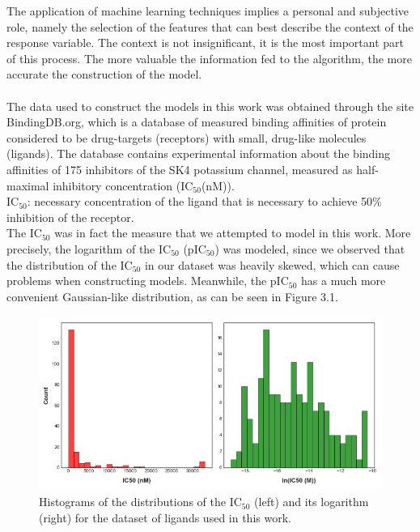 \hspace{1.5cm}The application of machine learning techniques implies a personal and subjective role, namely the selection of the features that can best describe the context of the response variable. The context is not insignificant, it is the most important part of this process. The more valuable the information fed to the algorithm, the more accurate the construction of the model.\\\\
The data used to construct the models in this work was obtained through the site BindingDB.org, which is a database of measured binding affinities of protein considered to be drug-targets (receptors) with small, drug-like molecules (ligands). The database contains experimental information about the binding affinities of 175 inhibitors of the SK4 potassium channel, measured as half-maximal inhibitory concentration ($\text{IC}_{50}$(nM)).\\

\textbullet\hspace{0.1cm} \textbf{$\text{IC}_{50}$}: necessary concentration of the ligand that is necessary to achieve 50\% inhibition of the receptor.\\

The $\text{IC}_{50}$ was in fact the measure that we attempted to model in this work. More precisely, the logarithm of the $\text{IC}_{50}$ (p$\text{IC}_{50}$) was modeled, since we observed that the distribution of the $\text{IC}_{50}$ in our dataset was heavily skewed, which can cause problems when constructing models. Meanwhile, the p$\text{IC}_{50}$ has a much more convenient Gaussian-like distribution, as can be seen in Figure 3.1.\\

\begin{figure}[h]
    \centering
    \includegraphics[width=14cm, height=5.7cm]{Images/Results/Feature Analysis/IC50_distributions.png}
    \caption{Histograms of the distributions of the $\text{IC}_{50}$ (left) and its logarithm (right) for the dataset of ligands used in this work.}
\end{figure}

